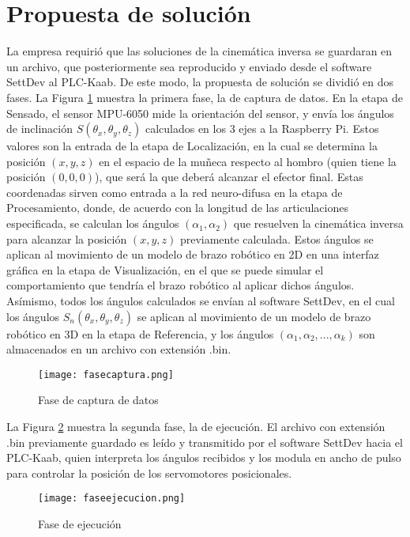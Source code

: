 \section{Propuesta de solución}

La empresa requirió que las soluciones de la cinemática inversa se guardaran en un archivo, que posteriormente sea reproducido y enviado desde el software SettDev al PLC-Kaab. De este modo, la propuesta de solución se dividió en dos fases. La Figura \ref{fig:fasecaptura} muestra la primera fase, la de captura de datos. En la etapa de Sensado, el sensor MPU-6050 mide la orientación del sensor, y envía los ángulos de inclinación $S(\theta_x, \theta_y, \theta_z)$ calculados en los 3 ejes a la Raspberry Pi. Estos valores son la entrada de la etapa de Localización, en la cual se determina la posición $(x, y, z)$ en el espacio de la muñeca respecto al hombro (quien tiene la posición $(0, 0, 0)$), que será la que deberá alcanzar el efector final. Estas coordenadas sirven como entrada a la red neuro-difusa en la etapa de Procesamiento, donde, de acuerdo con la longitud de las articulaciones especificada, se calculan los ángulos $(\alpha_1, \alpha_2)$ que resuelven la cinemática inversa para alcanzar la posición $(x, y, z)$ previamente calculada. Estos ángulos se aplican al movimiento de un modelo de brazo robótico en 2D en una interfaz gráfica en la etapa de Visualización, en el que se puede simular el comportamiento que tendría el brazo robótico al aplicar dichos ángulos. Asímismo, todos los ángulos calculados se envían al software SettDev, en el cual los ángulos $S_n(\theta_x, \theta_y, \theta_z)$ se aplican al movimiento de un modelo de brazo robótico en 3D en la etapa de Referencia, y los ángulos $(\alpha_1, \alpha_2, ..., \alpha_k)$ son almacenados en un archivo con extensión .bin.

\begin{figure}[htb]
	\centering
	\texttt{[image: fasecaptura.png]}
	\caption{Fase de captura de datos}
	\label{fig:fasecaptura}
\end{figure}

\newpage
La Figura \ref{fig:faseejecucion} muestra la segunda fase, la de ejecución. El archivo con extensión .bin previamente guardado es leído y transmitido por el software SettDev hacia el PLC-Kaab, quien interpreta los ángulos recibidos y los modula en ancho de pulso para controlar la posición de los servomotores posicionales.

\begin{figure}[htb]
	\centering
	\texttt{[image: faseejecucion.png]}
	\caption{Fase de ejecución}
	\label{fig:faseejecucion}
\end{figure}